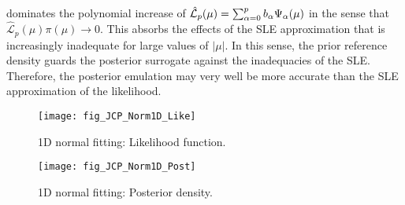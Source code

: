 dominates the polynomial increase of \(\hat{\mathcal{L}}_p(\mu) = \sum_{\alpha=0}^p b_{\alpha} \Psi_{\alpha}(\mu)\) in the sense that \(\hat{\mathcal{L}}_p(\mu) \pi(\mu) \rightarrow 0\).
This absorbs the effects of the SLE approximation that is increasingly inadequate for large values of \(\lvert \mu \rvert\).
In this sense, the prior reference density guards the posterior surrogate against the inadequacies of the SLE.
Therefore, the posterior emulation may very well be more accurate than the SLE approximation of the likelihood.
\begin{figure}[htbp]
  \begin{minipage}[b]{\JCPsubWidth}
    \centering
    \texttt{[image: fig\_JCP\_Norm1D\_Like]}
    \caption[1D normal fitting: Likelihood function]{1D normal fitting: Likelihood function.}
    \label{fig:JCP:Conjugate:Like}
  \end{minipage}%
  \hfill%
  \begin{minipage}[b]{\JCPsubWidth}
    \centering
    \texttt{[image: fig\_JCP\_Norm1D\_Post]}
    \caption[1D normal fitting: Posterior density]{1D normal fitting: Posterior density.}
    \label{fig:JCP:Conjugate:Post}
  \end{minipage}%
\end{figure}

